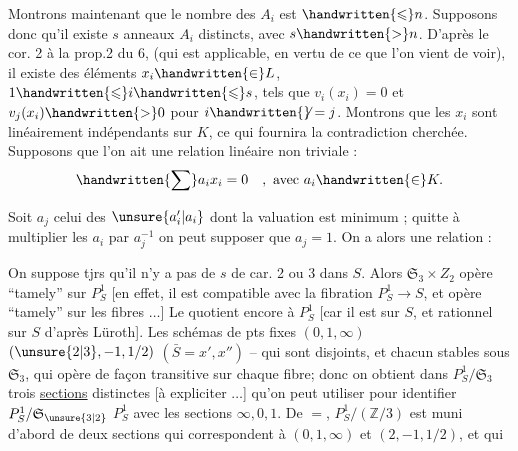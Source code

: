 Montrons maintenant que le nombre des $A_i$ est  $\handwritten{\leqslant}n$. Supposons donc qu'il existe $s$ anneaux $A_i$ distincts, avec $s\handwritten{>}n$. D'après le cor. 2 à la prop.2 du \handwritten{\S}6, (qui est applicable, en vertu de ce que l'on vient de voir), il existe des éléments $x_i\handwritten{\in}L$, $1\handwritten{\leqslant}i\handwritten{\leqslant}s$, tels que $v_i(x_i)=0$ et $v_j(x_i)\handwritten{>}0$ pour $i\handwritten{\not}=j$. Montrons que les $x_i$ sont linéairement indépendants sur $K$, ce qui fournira la contradiction cherchée. Supposons que l'on ait une relation linéaire non triviale :
\[
\handwritten{\sum} a_i x_i=0\quad,\ \text{avec }a_i\handwritten{\in}K.
\]

Soit $a_j$ celui des $\unsure{a'_i|a_i}$ dont la valuation est minimum ; quitte à multiplier les $a_i$ par $a_j^{-1}$ on peut supposer que $a_j=1$. On a alors une relation :


On suppose tjrs qu'il n'y a pas de  $s$ de car. 2 ou 3 dans $S$. Alors  $\mathfrak S_3\times Z_2$ opère ``tamely'' sur $P^1_S$ [en effet, il est compatible avec la fibration $P^1_S\to S$, et opère ``tamely'' sur les fibres $\ldots$] Le quotient    encore à $P^1_S$ [car il est \uline{} sur $S$, et rationnel sur $S$ d'après Lüroth]. Les schémas de pts fixes $(0,1,\infty)$ $(\unsure{2|3},-1,1/2)$ $(\bar S=x',x'')$ -- qui sont disjoints, et chacun stables sous $\mathfrak S_3$, qui   opère de façon  transitive sur chaque fibre; donc on obtient dans $P^1_S/\mathfrak S_3$ trois \uline{sections} distinctes [à expliciter $\ldots$] qu'on peut utiliser pour identifier $P^1_S/\mathfrak S_{\unsure{3|2}}$  $P^1_S$ avec les sections $\infty,0,1$. De $=$,  $P^1_S/(\mathbb Z/3)$ est muni d'abord de deux sections qui correspondent à $(0,1,\infty)$ et $(2,-1,1/2)$, et qui

